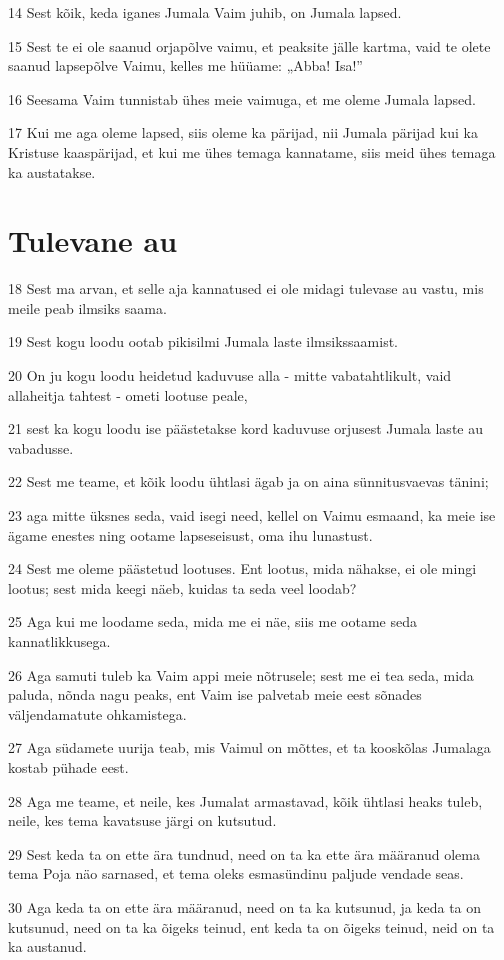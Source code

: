 \par 14 Sest kõik, keda iganes Jumala Vaim juhib, on Jumala lapsed.
\par 15 Sest te ei ole saanud orjapõlve vaimu, et peaksite jälle kartma, vaid te olete saanud lapsepõlve Vaimu, kelles me hüüame: „Abba! Isa!”
\par 16 Seesama Vaim tunnistab ühes meie vaimuga, et me oleme Jumala lapsed.
\par 17 Kui me aga oleme lapsed, siis oleme ka pärijad, nii Jumala pärijad kui ka Kristuse kaaspärijad, et kui me ühes temaga kannatame, siis meid ühes temaga ka austatakse.

\section*{Tulevane au}

\par 18 Sest ma arvan, et selle aja kannatused ei ole midagi tulevase au vastu, mis meile peab ilmsiks saama.
\par 19 Sest kogu loodu ootab pikisilmi Jumala laste ilmsikssaamist.
\par 20 On ju kogu loodu heidetud kaduvuse alla - mitte vabatahtlikult, vaid allaheitja tahtest - ometi lootuse peale,
\par 21 sest ka kogu loodu ise päästetakse kord kaduvuse orjusest Jumala laste au vabadusse.
\par 22 Sest me teame, et kõik loodu ühtlasi ägab ja on aina sünnitusvaevas tänini;
\par 23 aga mitte üksnes seda, vaid isegi need, kellel on Vaimu esmaand, ka meie ise ägame enestes ning ootame lapseseisust, oma ihu lunastust.
\par 24 Sest me oleme päästetud lootuses. Ent lootus, mida nähakse, ei ole mingi lootus; sest mida keegi näeb, kuidas ta seda veel loodab?
\par 25 Aga kui me loodame seda, mida me ei näe, siis me ootame seda kannatlikkusega.
\par 26 Aga samuti tuleb ka Vaim appi meie nõtrusele; sest me ei tea seda, mida paluda, nõnda nagu peaks, ent Vaim ise palvetab meie eest sõnades väljendamatute ohkamistega.
\par 27 Aga südamete uurija teab, mis Vaimul on mõttes, et ta kooskõlas Jumalaga kostab pühade eest.
\par 28 Aga me teame, et neile, kes Jumalat armastavad, kõik ühtlasi heaks tuleb, neile, kes tema kavatsuse järgi on kutsutud.
\par 29 Sest keda ta on ette ära tundnud, need on ta ka ette ära määranud olema tema Poja näo sarnased, et tema oleks esmasündinu paljude vendade seas.
\par 30 Aga keda ta on ette ära määranud, need on ta ka kutsunud, ja keda ta on kutsunud, need on ta ka õigeks teinud, ent keda ta on õigeks teinud, neid on ta ka austanud.

